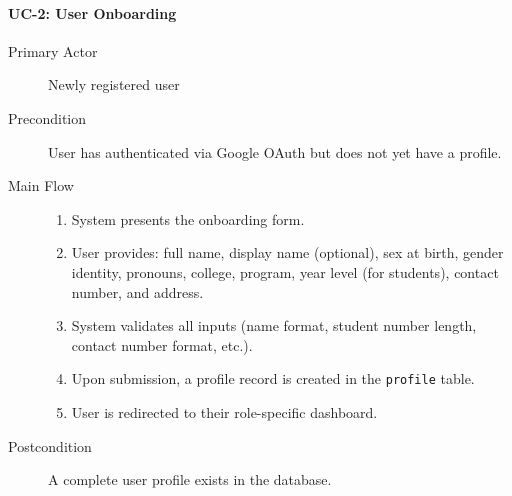 \documentclass[11pt,a4paper]{article}
\begin{document}
\paragraph{UC-2: User Onboarding}
\begin{description}
  \item[Primary Actor] Newly registered user
  \item[Precondition] User has authenticated via Google OAuth but does not yet have a profile.
  \item[Main Flow]
    \begin{enumerate}[leftmargin=1.5em]
      \item System presents the onboarding form.
      \item User provides: full name, display name (optional), sex at birth, gender identity, pronouns, college, program, year level (for students), contact number, and address.
      \item System validates all inputs (name format, student number length, contact number format, etc.).
      \item Upon submission, a profile record is created in the \texttt{profile} table.
      \item User is redirected to their role-specific dashboard.
    \end{enumerate}
  \item[Postcondition] A complete user profile exists in the database.
\end{description}
\end{document}
